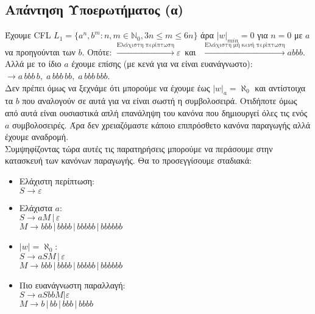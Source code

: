 \subsection{Απάντηση Υποερωτήματος (α)}
\label{ssec:Solution_1.1}
\doublespacing
Έχουμε CFL
$ L_1 = \{a^n, b^m : n, m \in \mathbb{N}_0, 3n \leq m \leq 6n \}$
άρα $\vert w \vert_{min} = 0$ για $n = 0$ με $a$ να προηγούνται των $b$. Οπότε:
$\overset{\text{Ελάχιστη περίπτωση}}{\rightarrow} ε\,$ και
$\;\,\overset{\text{Ελάχιστη μή κενή περίπτωση}}{\rightarrow} abbb$.\\
Αλλά με το ίδιο $a$ έχουμε επίσης (με κενά για να είναι ευανάγνωστο): $\rightarrow a\,bbb\,b,\;
a\,bbb\,bb, \; a\,bbb\,bbb$.\\
Δεν πρέπει όμως να ξεχνάμε ότι μπορούμε να έχουμε έως $|w|_a = \aleph_0$ και αντίστοιχα τα $b$ που αναλογούν σε
αυτά για να είναι σωστή η συμβολοσειρά. Οτιδήποτε όμως από αυτά είναι ουσιαστικά απλή επανάληψη του κανόνα που
δημιουργεί όλες τις ενός $a$ συμβολοσειρές. Άρα δεν χρειαζόμαστε κάποιο
επιπρόσθετο κανόνα παραγωγής αλλά έχουμε αναδρομή.\\
Συμψηφίζοντας τώρα αυτές τις παρατηρήσεις μπορούμε να περάσουμε στην κατασκευή των κανόνων παραγωγής. Θα το
προσεγγίσουμε σταδιακά:
\begin{itemize}
	\itemsep0em

	\item Ελάχιστη περίπτωση:\\
	$S \rightarrow ε$

	\item Ελάχιστα $a$:\\
	$S \rightarrow aΜ \,|\, ε$\\
	$M \rightarrow bbb \,|\, bbbb \,|\, bbbbb \,|\, bbbbbb$

	\item $|w| = \aleph_0$:\\
	$S \rightarrow aSM \,|\, ε$\\
	$M \rightarrow bbb \,|\, bbbb \,|\, bbbbb \,|\, bbbbbb$

	\item Πιο ευανάγνωστη παραλλαγή:\\
	$S \rightarrow aSbbM | ε$\\
	$M \rightarrow b \,|\, bb \,|\, bbb \,|\, bbbb$
\end{itemize}

